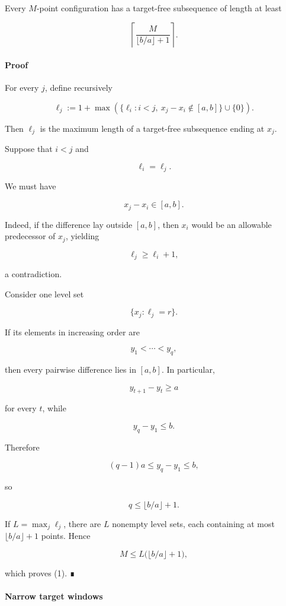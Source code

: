 Every \(M\)-point configuration has a target-free subsequence of length at least

\[
\boxed{
\left\lceil
\frac{M}{\lfloor b/a\rfloor+1}
\right\rceil.
}
\tag{1}
\]

\paragraph{Proof}

For every \(j\), define recursively

\[
\ell_j
:=
1+
\max\left(
\{\ell_i:i<j,\ x_j-x_i\notin[a,b]\}\cup\{0\}
\right).
\]

Then \(\ell_j\) is the maximum length of a target-free subsequence ending at \(x_j\).

Suppose that \(i<j\) and

\[
\ell_i=\ell_j.
\]

We must have

\[
x_j-x_i\in[a,b].
\]

Indeed, if the difference lay outside \([a,b]\), then \(x_i\) would be an allowable predecessor of \(x_j\), yielding

\[
\ell_j\ge\ell_i+1,
\]

a contradiction.

Consider one level set

\[
\{x_j:\ell_j=r\}.
\]

If its elements in increasing order are

\[
y_1<\cdots<y_q,
\]

then every pairwise difference lies in \([a,b]\). In particular,

\[
y_{t+1}-y_t\ge a
\]

for every \(t\), while

\[
y_q-y_1\le b.
\]

Therefore

\[
(q-1)a
\le y_q-y_1
\le b,
\]

so

\[
q\le\lfloor b/a\rfloor+1.
\]

If \(L=\max_j\ell_j\), there are \(L\) nonempty level sets, each containing at most \(\lfloor b/a\rfloor+1\) points. Hence

\[
M\le L\bigl(\lfloor b/a\rfloor+1\bigr),
\]

which proves (1). ∎

\paragraph{Narrow target windows}

